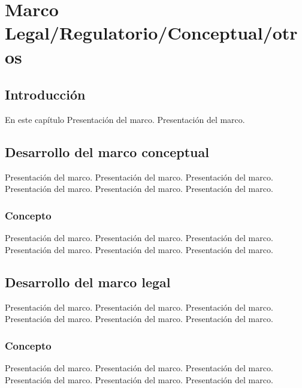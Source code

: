 \chapter{Marco Legal/Regulatorio/Conceptual/otros} \label{c::Marcos}

\section{Introducción}
En este capítulo Presentación del marco. Presentación del marco.

\section{Desarrollo del marco conceptual}
Presentación del marco. Presentación del marco. Presentación del marco. Presentación del marco. Presentación del marco. Presentación del marco.

\subsection{Concepto}
Presentación del marco. Presentación del marco. Presentación del marco. Presentación del marco. Presentación del marco. Presentación del marco.

\section{Desarrollo del marco legal}
Presentación del marco. Presentación del marco. Presentación del marco. Presentación del marco. Presentación del marco. Presentación del marco.

\subsection{Concepto}
Presentación del marco. Presentación del marco. Presentación del marco. Presentación del marco. Presentación del marco. Presentación del marco.
